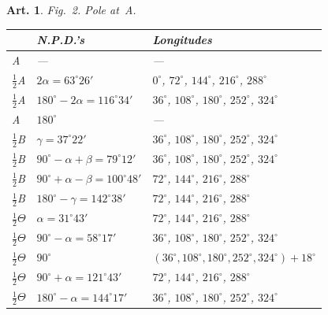 \documentclass[11pt,a4paper]{article}
\theoremstyle{plain}
\newtheorem{art}{Art.}[section]
\begin{document}
\begin{art}
Fig.~2. Pole at~A.

\begin{center}
\begin{tabular}{|l|l|l|}
\hline
& N.P.D.'s & Longitudes \\
\hline
A & --- & --- \\
\hline
$\frac{1}{2}$A & $2\alpha = 63^\circ 26'$ & $0^\circ$, $72^\circ$, $144^\circ$, $216^\circ$, $288^\circ$ \\
$\frac{1}{2}$A & $180^\circ - 2\alpha = 116^\circ 34'$ & $36^\circ$, $108^\circ$, $180^\circ$, $252^\circ$, $324^\circ$ \\
A & $180^\circ$ & --- \\
\hline
$\frac{1}{2}$B & $\gamma = 37^\circ 22'$ & $36^\circ$, $108^\circ$, $180^\circ$, $252^\circ$, $324^\circ$ \\
$\frac{1}{2}$B & $90^\circ - \alpha + \beta = 79^\circ 12'$ & $36^\circ$, $108^\circ$, $180^\circ$, $252^\circ$, $324^\circ$ \\
$\frac{1}{2}$B & $90^\circ + \alpha - \beta = 100^\circ 48'$ & $72^\circ$, $144^\circ$, $216^\circ$, $288^\circ$ \\
$\frac{1}{2}$B & $180^\circ - \gamma = 142^\circ 38'$ & $72^\circ$, $144^\circ$, $216^\circ$, $288^\circ$ \\
\hline
$\frac{1}{2}\Theta$ & $\alpha = 31^\circ 43'$ & $72^\circ$, $144^\circ$, $216^\circ$, $288^\circ$ \\
$\frac{1}{2}\Theta$ & $90^\circ - \alpha = 58^\circ 17'$ & $36^\circ$, $108^\circ$, $180^\circ$, $252^\circ$, $324^\circ$ \\
$\frac{1}{2}\Theta$ & $90^\circ$ & $(36^\circ, 108^\circ, 180^\circ, 252^\circ, 324^\circ) + 18^\circ$ \\
$\frac{1}{2}\Theta$ & $90^\circ + \alpha = 121^\circ 43'$ & $72^\circ$, $144^\circ$, $216^\circ$, $288^\circ$ \\
$\frac{1}{2}\Theta$ & $180^\circ - \alpha = 144^\circ 17'$ & $36^\circ$, $108^\circ$, $180^\circ$, $252^\circ$, $324^\circ$ \\
\hline
\end{tabular}
\end{center}
\end{art}
\end{document}
